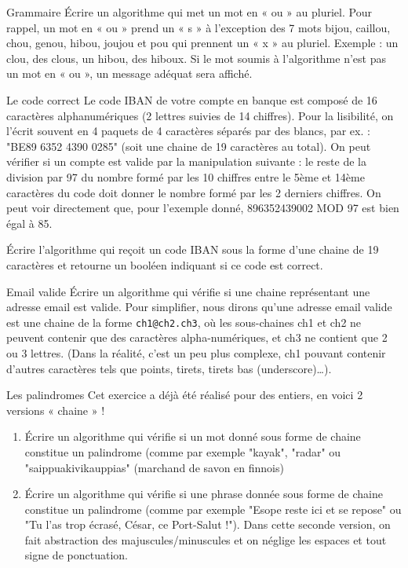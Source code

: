 \begin{Exercice}{Grammaire}
	Écrire un algorithme 
	qui met un mot en « ou » au pluriel. 
	Pour rappel, 
	un mot en « ou » prend un « s » à l'exception des 7 mots 
	bijou, caillou, chou, genou, hibou, joujou et pou qui prennent 
	un « x » au pluriel. 
	Exemple : un clou, des clous, un hibou, des hiboux. 
	Si le mot soumis à l'algorithme n'est pas un mot en « ou », 
	un message adéquat sera affiché.
\end{Exercice}

\begin{Exercice}{Le code correct}
	Le code IBAN de votre compte en banque 
	est composé de 16 caractères alphanumériques 
	(2 lettres suivies de 14 chiffres). 
	Pour la lisibilité, 
	on l'écrit souvent en 4 paquets de 4 caractères 
	séparés par des blancs, par ex. : "BE89 6352 4390 0285" 
	(soit une chaine de 19 caractères au total). 
	On peut vérifier si un compte est valide par la manipulation suivante :
	le reste de la division par 97 du nombre formé 
	par les 10 chiffres entre le 5ème et 14ème caractères du code 
	doit donner le nombre formé par les 2 derniers chiffres. 
	On peut voir directement que, pour l'exemple donné, 
	896352439002 MOD 97 est bien égal à 85.

	Écrire l'algorithme qui reçoit un code IBAN sous la forme 
	d'une chaine de 19 caractères
	et retourne un booléen indiquant si ce code est correct.
\end{Exercice}

\begin{Exercice}{Email valide}
	Écrire un algorithme 
	qui vérifie si une chaine représentant une adresse email 
	est valide. 
	Pour simplifier, 
	nous dirons qu'une adresse email valide 
	est une chaine de la forme \verb|ch1@ch2.ch3|, 
	où les sous-chaines ch1 et ch2 ne peuvent contenir 
	que des caractères alpha-numériques, 
	et ch3 ne contient que 2 ou 3 lettres. 
	(Dans la réalité, c'est un peu plus complexe, 
	ch1 pouvant contenir d'autres caractères 
	tels que points, tirets, tirets bas (underscore)\dots).
\end{Exercice}

\begin{Exercice}{Les palindromes}
	Cet exercice a déjà été réalisé pour des entiers, 
	en voici 2 versions « chaine » ! 
	\begin{enumerate}[label=\alph*)]
	\item 
		Écrire un algorithme qui vérifie 
		si un mot donné sous forme de chaine 
		constitue un palindrome 
		(comme par exemple "kayak", "radar" ou "saippuakivikauppias" 
		(marchand de savon en finnois)
	\item
		Écrire un algorithme qui vérifie 
		si une phrase donnée sous forme de chaine constitue un palindrome 
		(comme par exemple "Esope reste ici et se repose" 
		ou "Tu l'as trop écrasé, César, ce Port-Salut !"). 
		Dans cette seconde version, 
		on fait abstraction des majuscules/minuscules 
		et on néglige les espaces et tout signe de ponctuation.
	\end{enumerate}
\end{Exercice}


